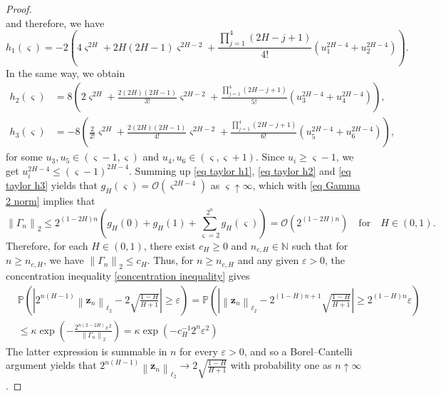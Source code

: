 \documentclass[12pt,reqno]{article}
\def\eps{\varepsilon}
\newcommand{\norm}[1]{\left\lVert {#1}\right\rVert}
\def\ua{\uparrow}
\numberwithin{equation}{section}
\theoremstyle{definition}
\def\eps{\varepsilon}
\def\ua{\uparrow}
\newcommand{\bN}{\mathbb{N}}
\newcommand{\bP}{\mathbb{P}}
\begin{document}
\begin{proof}
\begin{equation*}
	\end{equation*}
	and therefore, we have 
	\begin{equation}\label{eq taylor h1}
	h_1(\varsigma) = -2\left(4 \varsigma^{2H} + 2H(2H-1)\varsigma^{2H-2} + \frac{\prod_{j = 1}^{4}(2H-j+1)}{4!}(u_1^{2H-4}+u_2^{2H-4})\right).
	\end{equation}
	In the same way, we obtain
	\begin{align}
	h_2(\varsigma)  &= 8\left(2\varsigma^{2H} + \frac{2(2H)(2H-1)}{3!}\varsigma^{2H-2} +\frac{\prod_{j = 1}^{4}(2H-j+1)}{5!} (u_3^{2H-4}+u_4^{2H-4})\right),\label{eq taylor h2}\\
	h_3(\varsigma)  &= -8\left(\frac{2}{2!}\varsigma^{2H} + \frac{2(2H)(2H-1)}{4!}\varsigma^{2H-2} +\frac{\prod_{j = 1}^{4}(2H-j+1)}{6!}(u_5^{2H-4}+u_6^{2H-4}) \right),\label{eq taylor h3}
	\end{align}
	for some $u_3,u_5 \in (\varsigma-1, \varsigma)$ and $u_4, u_6 \in (\varsigma, \varsigma+1)$. Since $u_i \ge \varsigma - 1$,  we get $u_i^{2H-4} \le (\varsigma-1)^{2H-4}$. Summing up \eqref{eq taylor h1}, \eqref{eq taylor h2} and \eqref{eq taylor h3} yields that $g_H(\varsigma) = \mathcal{O}(\varsigma^{2H-4})$ as $\varsigma \ua \infty$, which with \eqref{eq Gamma 2 norm} implies that
	\begin{equation}\label{eq fbm variance}
	\norm{\Gamma_n}_2  \le 2^{(1-2H)n}\left(g_H(0)+g_H(1)+\sum_{\varsigma = 2}^{2^n}g_H(\varsigma)\right) = \mathcal{O}(2^{(1-2H)n}) \quad \text{for} \quad H \in (0,1).
	\end{equation}
	Therefore, for each $H \in (0,1)$, there exist $c_H\ge 0$ and $n_{c,H} \in \bN$ such that for $n \ge n_{c,H}$, we have $\norm{\Gamma_n}_2 \le c_H$. Thus, for $n \ge n_{c,H}$ and any given $\varepsilon > 0$, the concentration inequality \eqref{concentration inequality} gives	\begin{equation*}
	\begin{split}
	&\bP\left(\left|2^{n(H-1)}\norm{\bm z_n}_{\ell_2}- 2\sqrt{\frac{1-H}{H+1}}\right| \ge \varepsilon\right)= \bP\left(\left|\norm{\bm z_n}_{\ell_2}- 2^{(1-H)n+1}\sqrt{\frac{1-H}{H+1}}\right| \ge 2^{(1-H)n}\varepsilon\right)\\ &\le \kappa\exp\left(-\frac{2^{n(2-2H)}\varepsilon^2}{\norm{\Gamma_n}_2}\right)= \kappa\exp(-c^{-1}_H2^{n}\varepsilon^2)
	\end{split}
	\end{equation*}
	The latter expression is summable in $n$ for every $\eps>0$, and so a Borel--Cantelli argument yields that $2^{n(H-1)}\norm{\bm z_n}_{\ell_2} \rightarrow 2\sqrt{\frac{1-H}{H+1}}$ with probability one as $n \ua \infty$.\end{proof}
\end{document}
